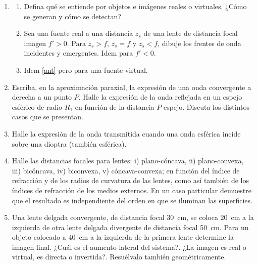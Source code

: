 \documentclass[11pt,spanish,a4paper]{article}
\begin{document}
\begin{enumerate}
\item
\begin{enumerate}
	\item Defina qué se entiende por objetos e imágenes reales o virtuales.
		¿Cómo se generan y cómo se detectan?.
	\item \label{ant} Sea una fuente real a una distancia \(z_s\) de una lente de distancia focal imagen \(f'>0\).
		Para \(z_s> f\), \(z_s= f\) y \(z_s< f\), dibuje los frentes de onda incidentes y emergentes.
		Idem para \(f'< 0\).
	\item Idem \ref{ant} pero para una fuente virtual.
\end{enumerate}


\item Escriba, en la aproximación paraxial, la expresión de una onda convergente a derecha a un punto \(P\).
	Halle la expresión de la onda reflejada en un espejo esférico de radio \(R_1\) en función de la distancia \(P\)-espejo.
	Discuta los distintos casos que se presentan.


\item Halle la expresión de la onda transmitida cuando una onda esférica incide sobre una dioptra (también esférica).

\item Halle las distancias focales para lentes: i) plano-cóncava, ii) plano-convexa,
iii) bicóncava, iv) biconvexa, v) cóncava-convexa; en función del índice de refracción y
de los radios de curvatura de las lentes, como así también de los índices de refracción de
los medios externos.
En un caso particular demuestre que el resultado es independiente del orden en que se iluminan las superficies.

\item Una lente delgada convergente, de distancia focal \SI{30}{cm}, se coloca \SI{20}{cm} a la izquierda de otra lente delgada divergente de distancia focal \SI{50}{cm}.
	Para un objeto colocado a \SI{40}{cm} a la izquierda de la primera lente determine la imagen final.
	¿Cuál es el aumento lateral del sistema?.
	¿La imagen es real o virtual, es directa o invertida?.
	Resuélvalo también geométricamente.


\end{enumerate}
\end{document}

